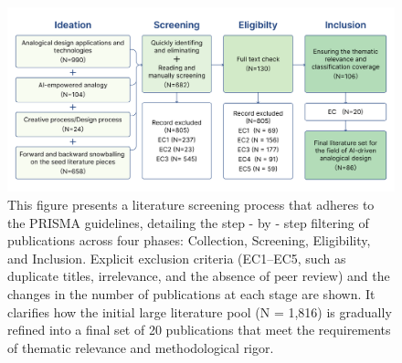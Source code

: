 \begin{figure}
    \centering
    \includegraphics[width=1\linewidth]{Figures/prisma selection.png}
    \caption{This figure presents a literature screening process that adheres to the PRISMA guidelines, detailing the step - by - step filtering of publications across four phases: Collection, Screening, Eligibility, and Inclusion. Explicit exclusion criteria (EC1–EC5, such as duplicate titles, irrelevance, and the absence of peer review) and the changes in the number of publications at each stage are shown. It clarifies how the initial large literature pool (N = 1,816) is gradually refined into a final set of 20 publications that meet the requirements of thematic relevance and methodological rigor.}
    \label{fig:prisma-selection}
\end{figure}





 
